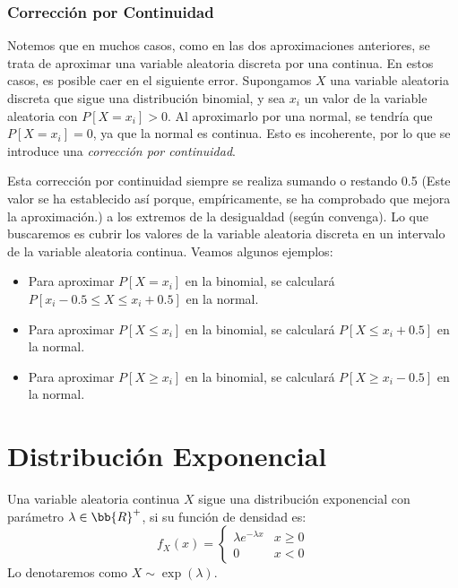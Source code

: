 \subsubsection{Corrección por Continuidad}

Notemos que en muchos casos, como en las dos aproximaciones anteriores, se trata de aproximar una variable aleatoria discreta por una continua.
En estos casos, es posible caer en el siguiente error.
Supongamos $X$ una variable aleatoria discreta que sigue una distribución binomial,
y sea $x_i$ un valor de la variable aleatoria con $P[X=x_i]>0$. Al aproximarlo por una normal, se tendría que $P[X=x_i] = 0$, ya que la normal es continua.
Esto es incoherente, por lo que se introduce una \emph{corrección por continuidad}.

Esta corrección por continuidad siempre se realiza sumando o restando 0.5 (Este valor se ha establecido así porque, empíricamente, se ha comprobado que mejora la aproximación.) a los extremos de la desigualdad (según convenga).
Lo que buscaremos es cubrir los valores de la variable aleatoria discreta en un intervalo de la variable aleatoria continua. Veamos algunos ejemplos:
\begin{itemize}
    \item Para aproximar $P[X= x_i]$ en la binomial, se calculará $P[x_i-0.5 \leq X\leq x_i+0.5]$ en la normal.
    \item Para aproximar $P[X\leq x_i]$ en la binomial, se calculará $P[X\leq x_i+0.5]$ en la normal.
    \item Para aproximar $P[X\geq x_i]$ en la binomial, se calculará $P[X\geq x_i-0.5]$ en la normal.
\end{itemize}


\section{Distribución Exponencial}

\begin{definicion}
    Una variable aleatoria continua $X$ sigue una distribución exponencial con parámetro $\lambda\in \bb{R}^+$, si su función de densidad es:
    \begin{equation*}
        f_X(x) = \begin{cases}
            \lambda e^{-\lambda x} & x\geq 0\\
            0 & x<0
        \end{cases}
    \end{equation*}
    Lo denotaremos como $X\sim \exp(\lambda)$.
\end{definicion}

